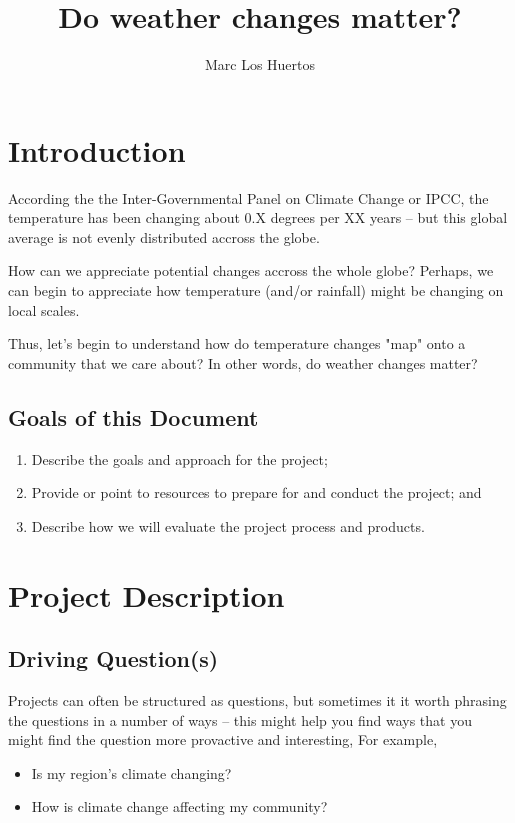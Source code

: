 \documentclass{article}\usepackage[]{graphicx}\usepackage[]{color}
\title{Do weather changes matter?}
\author{Marc Los Huertos}
\begin{document}
\maketitle

\section{Introduction}

According the the Inter-Governmental Panel on Climate Change or IPCC, the temperature has been changing about 0.X degrees per XX years -- but this global average is not evenly distributed accross the globe. 

How can we appreciate potential changes accross the whole globe?  Perhaps, we can begin to appreciate how temperature (and/or rainfall) might be changing on local scales.

Thus, let's begin to understand how do temperature changes "map" onto a community that we care about? In other words, do weather changes matter?

\subsection{Goals of this Document}

\begin{enumerate}
  \item Describe the goals and approach for the project;
  \item Provide or point to resources to prepare for and conduct the project; and
  \item Describe how we will evaluate the project process and products.
\end{enumerate}

\section{Project Description}

\subsection{Driving Question(s)}

Projects can often be structured as questions, but sometimes it it worth phrasing the questions in a number of ways -- this might help you find ways that you might find the question more provactive and interesting, For example,

\begin{itemize}
  \item Is my region's climate changing?
  \item How is climate change affecting my community?
\end{itemize}
\end{document}
